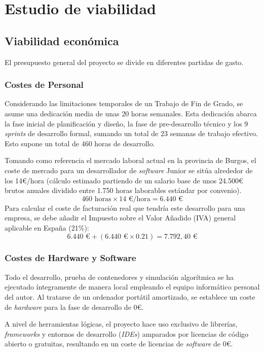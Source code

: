 \section{Estudio de viabilidad}

\subsection{Viabilidad económica}
El presupuesto general del proyecto se divide en diferentes partidas de gasto.

\subsubsection*{Costes de Personal}
Considerando las limitaciones temporales de un Trabajo de Fin de Grado, se asume una dedicación media de unas 20 horas semanales. Esta dedicación abarca la fase inicial de planificación y diseño, la fase de pre-desarrollo técnico y los 9 \textit{sprints} de desarrollo formal, sumando un total de 23 semanas de trabajo efectivo. Esto supone un total de 460 horas de desarrollo.

Tomando como referencia el mercado laboral actual en la provincia de Burgos, el coste de mercado para un desarrollador de \textit{software} Junior se sitúa alrededor de los 14€/hora (cálculo estimado partiendo de un salario base de unos 24.500€ brutos anuales dividido entre 1.750 horas laborables estándar por convenio).
$$ 460 \text{ horas} \times 14 \text{ €/hora} = 6.440 \text{ €} $$
Para calcular el coste de facturación real que tendría este desarrollo para una empresa, se debe añadir el Impuesto sobre el Valor Añadido (IVA) general aplicable en España (21\%):
$$ 6.440 \text{ €} + (6.440 \text{ €} \times 0.21) = 7.792,40 \text{ €} $$

\subsubsection*{Costes de Hardware y Software}
Todo el desarrollo, prueba de contenedores y simulación algorítmica se ha ejecutado íntegramente de manera local empleando el equipo informático personal del autor. Al tratarse de un ordenador portátil amortizado, se establece un coste de \textit{hardware} para la fase de desarrollo de 0€.

A nivel de herramientas lógicas, el proyecto hace uso exclusivo de librerías, \textit{frameworks} y entornos de desarrollo (\textit{IDEs}) amparados por licencias de código abierto o gratuitas, resultando en un coste de licencias de \textit{software} de 0€.


